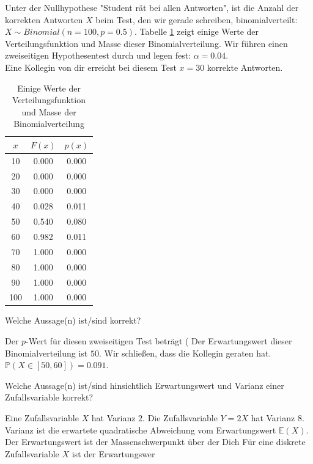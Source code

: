 \documentclass[10pt,addpoints]{exam}
\begin{document}
\begin{questions}
\question Unter der Nullhypothese "Student rät bei allen Antworten", ist die Anzahl der korrekten Antworten $X$
beim Test, den wir gerade schreiben, binomialverteilt: $X \sim Binomial(n=100, p=0.5)$.
Tabelle \ref{tab:binomialwerte} zeigt einige Werte der
Verteilungsfunktion und Masse dieser Binomialverteilung. 
Wir führen einen zweiseitigen Hypothesentest durch und legen fest: $\alpha = 0.04$.\\
Eine Kollegin von dir erreicht bei diesem Test $x=30$ korrekte Antworten.
\\
\begin{table}[h!]
    \centering
    \caption{Einige Werte der Verteilungsfunktion und Masse der Binomialverteilung}
    \label{tab:binomialwerte}
    \begin{tabular}{|c|c|c|}
    \hline
    $x$ & $F(x)$ & $p(x)$ \\
    \hline
    10  & 0.000 & 0.000 \\
    20  & 0.000 & 0.000 \\
    30  & 0.000 & 0.000 \\
    40  & 0.028 & 0.011 \\
    50  & 0.540 & 0.080 \\
    60  & 0.982 & 0.011 \\
    70  & 1.000 & 0.000 \\
    80  & 1.000 & 0.000 \\
    90  & 1.000 & 0.000 \\
    100 & 1.000 & 0.000 \\
    \hline
    \end{tabular}
    \end{table}

Welche Aussage(n) ist/sind korrekt?
\\
\begin{choices}
\CorrectChoice Der $p$-Wert für diesen zweiseitigen Test beträgt (
\CorrectChoice Der Erwartungswert dieser Binomialverteilung ist $50$.
\choice Wir schließen, dass die Kollegin geraten hat.
\choice $\mathbb{P}(X \in [50, 60]) = 0.091$.
\end{choices}

\question Welche Aussage(n) ist/sind hinsichtlich Erwartungswert und Varianz einer Zufallsvariable korrekt?
\\
\begin{choices}
\CorrectChoice Eine Zufallsvariable $X$ hat Varianz $2$. Die Zufallsvariable $Y = 2X$ hat Varianz $8$.
\CorrectChoice Varianz ist die erwartete quadratische Abweichung vom Erwartungswert $\mathbb{E}(X)$.
\CorrectChoice Der Erwartungswert ist der Massenschwerpunkt über der Dich
\CorrectChoice Für eine diskrete Zufallsvariable $X$ ist der Erwartungswer
\end{choices}


\end{questions}
\end{document}
